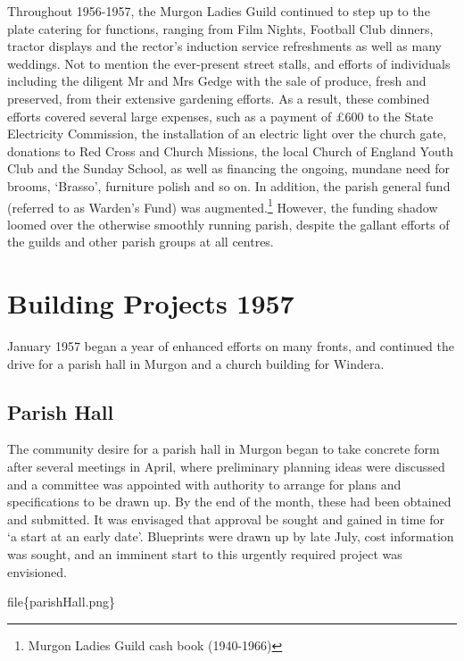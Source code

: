 Throughout 1956-1957, the Murgon Ladies Guild continued to step up to the plate catering for functions, ranging from Film Nights, Football Club dinners, tractor displays and the rector's induction service refreshments as well as many weddings. Not to mention the ever-present street stalls, and efforts of individuals including the diligent Mr and Mrs Gedge with the sale of produce, fresh and preserved, from their extensive gardening efforts. As a result, these combined efforts covered several large expenses, such as a payment of £600 to the State Electricity Commission, the installation of an electric light over the church gate, donations to Red Cross and Church Missions, the local Church of England Youth Club and the Sunday School, as well as financing the ongoing, mundane need for brooms, `Brasso', furniture polish and so on. In addition, the parish general fund (referred to as Warden's Fund) was augmented.\footnote{Murgon Ladies Guild cash book (1940-1966)} However, the funding shadow loomed over the otherwise smoothly running parish, despite the gallant efforts of the guilds and other parish groups at all centres.

\hypertarget{building-projects-1957}{%
\section{Building Projects 1957}\label{building-projects-1957}}

January 1957 began a year of enhanced efforts on many fronts, and continued the drive for a parish hall in Murgon and a church building for Windera.

\hypertarget{parish-hall}{%
\subsection{Parish Hall}\label{parish-hall}}

The community desire for a parish hall in Murgon began to take concrete form after several meetings in April, where preliminary planning ideas were discussed and a committee was appointed with authority to arrange for plans and specifications to be drawn up. By the end of the month, these had been obtained and submitted. It was envisaged that approval be sought and gained in time for `a start at an early date'. Blueprints were drawn up by late July, cost information was sought, and an imminent start to this urgently required project was envisioned.

file\{parishHall.png\}

